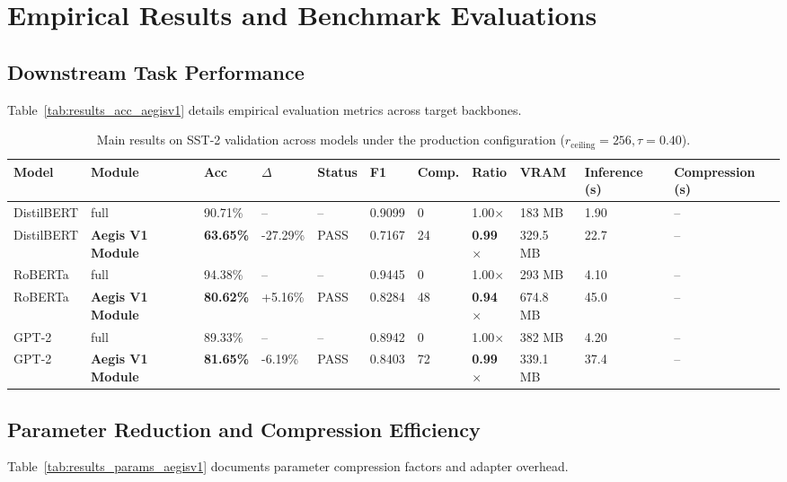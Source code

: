 \section{Empirical Results and Benchmark Evaluations}

\subsection{Downstream Task Performance}
Table~\ref{tab:results_acc_aegisv1} details empirical evaluation metrics across target backbones.

\begin{table}[t]
\centering
\small
\begin{tabular}{lllllllllll}
\toprule
\textbf{Model} & \textbf{Module} & \textbf{Acc} & \textbf{$\Delta$} & \textbf{Status} & \textbf{F1} & \textbf{Comp.} & \textbf{Ratio} & \textbf{VRAM} & \textbf{Inference (s)} & \textbf{Compression (s)} \\
\midrule
DistilBERT & full & 90.71\% & -- & -- & 0.9099 & 0 & 1.00$\times$ & 183 MB & 1.90 & -- \\
DistilBERT & \textbf{Aegis V1 Module} & \textbf{63.65\%} & -27.29\% & PASS & 0.7167 & 24 & \textbf{0.99$\times$} & 329.5 MB & 22.7 & -- \\
RoBERTa & full & 94.38\% & -- & -- & 0.9445 & 0 & 1.00$\times$ & 293 MB & 4.10 & -- \\
RoBERTa & \textbf{Aegis V1 Module} & \textbf{80.62\%} & +5.16\% & PASS & 0.8284 & 48 & \textbf{0.94$\times$} & 674.8 MB & 45.0 & -- \\
GPT-2 & full & 89.33\% & -- & -- & 0.8942 & 0 & 1.00$\times$ & 382 MB & 4.20 & -- \\
GPT-2 & \textbf{Aegis V1 Module} & \textbf{81.65\%} & -6.19\% & PASS & 0.8403 & 72 & \textbf{0.99$\times$} & 339.1 MB & 37.4 & -- \\
\bottomrule
\end{tabular}
\caption{Main results on SST-2 validation across models under the production configuration ($r_{\mathrm{ceiling}}=256, \tau=0.40$).}
\label{tab:main_sst2}
\end{table}

\subsection{Parameter Reduction and Compression Efficiency}
Table~\ref{tab:results_params_aegisv1} documents parameter compression factors and adapter overhead.

